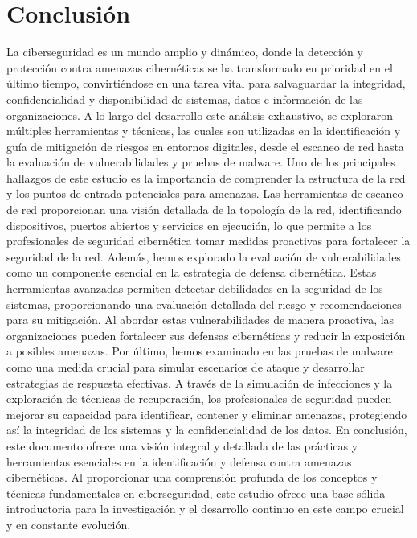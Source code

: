 \documentclass[stu, 11pt, letterpaper, donotrepeattitle, floatsintext, natbib]{apa7}
\begin{document}
\newpage

\section{\large Conclusión}

La ciberseguridad es un mundo amplio y dinámico, donde la detección y protección contra amenazas cibernéticas se ha transformado en prioridad en el último tiempo, convirtiéndose en una tarea vital para salvaguardar la integridad, confidencialidad y disponibilidad de sistemas, datos e información de las organizaciones. A lo largo del desarrollo este análisis exhaustivo, se exploraron múltiples herramientas y técnicas, las cuales son utilizadas en la identificación y guía de mitigación de riesgos en entornos digitales, desde el escaneo de red hasta la evaluación de vulnerabilidades y pruebas de malware. 
Uno de los principales hallazgos de este estudio es la importancia de comprender la estructura de la red y los puntos de entrada potenciales para amenazas. Las herramientas de escaneo de red proporcionan una visión detallada de la topología de la red, identificando dispositivos, puertos abiertos y servicios en ejecución, lo que permite a los profesionales de seguridad cibernética tomar medidas proactivas para fortalecer la seguridad de la red. 
Además, hemos explorado la evaluación de vulnerabilidades como un componente esencial en la estrategia de defensa cibernética. Estas herramientas avanzadas permiten detectar debilidades en la seguridad de los sistemas, proporcionando una evaluación detallada del riesgo y recomendaciones para su mitigación. Al abordar estas vulnerabilidades de manera proactiva, las organizaciones pueden fortalecer sus defensas cibernéticas y reducir la exposición a posibles amenazas. 
Por último, hemos examinado en las pruebas de malware como una medida crucial para simular escenarios de ataque y desarrollar estrategias de respuesta efectivas. A través de la simulación de infecciones y la exploración de técnicas de recuperación, los profesionales de seguridad pueden mejorar su capacidad para identificar, contener y eliminar amenazas, protegiendo así la integridad de los sistemas y la confidencialidad de los datos. 
En conclusión, este documento ofrece una visión integral y detallada de las prácticas y herramientas esenciales en la identificación y defensa contra amenazas cibernéticas. Al proporcionar una comprensión profunda de los conceptos y técnicas fundamentales en ciberseguridad, este estudio ofrece una base sólida introductoria para la investigación y el desarrollo continuo en este campo crucial y en constante evolución.


\newpage
\renewcommand\refname{\large\textbf{Referencias}}

\end{document}
